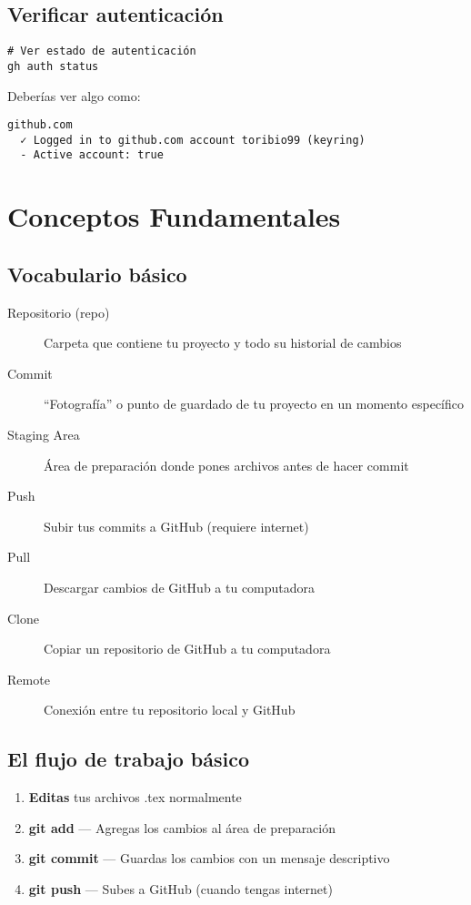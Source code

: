 \documentclass[12pt,a4paper]{article}
\begin{document}
\subsection{Verificar autenticación}

\begin{lstlisting}[style=bashstyle]
# Ver estado de autenticación
gh auth status
\end{lstlisting}

Deberías ver algo como:
\begin{lstlisting}[style=bashstyle]
github.com
  ✓ Logged in to github.com account toribio99 (keyring)
  - Active account: true
\end{lstlisting}

\section{Conceptos Fundamentales}

\subsection{Vocabulario básico}

\begin{description}
  \item[Repositorio (repo)] Carpeta que contiene tu proyecto y todo su historial de cambios
  \item[Commit] ``Fotografía'' o punto de guardado de tu proyecto en un momento específico
  \item[Staging Area] Área de preparación donde pones archivos antes de hacer commit
  \item[Push] Subir tus commits a GitHub (requiere internet)
  \item[Pull] Descargar cambios de GitHub a tu computadora
  \item[Clone] Copiar un repositorio de GitHub a tu computadora
  \item[Remote] Conexión entre tu repositorio local y GitHub
\end{description}

\subsection{El flujo de trabajo básico}

\begin{infobox}
\begin{enumerate}
  \item \textbf{Editas} tus archivos .tex normalmente
  \item \textbf{git add} --- Agregas los cambios al área de preparación
  \item \textbf{git commit} --- Guardas los cambios con un mensaje descriptivo
  \item \textbf{git push} --- Subes a GitHub (cuando tengas internet)
\end{enumerate}
\end{infobox}
\end{document}
